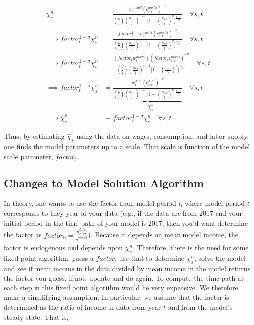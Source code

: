 \documentclass[letterpaper,12pt]{article}
\theoremstyle{definition}
\begin{document}
  \begin{equation}\label{EqChi_ns_model_algebra}
    \begin{split}
      \chi^n_s & = \frac{w^{model}_t\left(c^{model}_{s,t}\right)^{-\sigma}}{\left(\frac{b}{\tilde{l}}\right)\left(\frac{n_{s,t}}{\tilde{l}}\right)^{\upsilon-1}\Biggl[1 - \left(\frac{n_{s,t}}{\tilde{l}}\right)^\upsilon\Biggr]^{\frac{1-\upsilon}{\upsilon}}} \quad\forall s, t \\
      \implies factor^{1-\sigma}_{t} \chi^{n}_{s} & = \frac{factor^{1-\sigma}_{t}w^{model}_t\left(c^{model}_{s,t}\right)^{-\sigma}}{\left(\frac{b}{\tilde{l}}\right)\left(\frac{n_{s,t}}{\tilde{l}}\right)^{\upsilon-1}\Biggl[1 - \left(\frac{n_{s,t}}{\tilde{l}}\right)^\upsilon\Biggr]^{\frac{1-\upsilon}{\upsilon}}} \quad\forall s, t \\
      \implies factor^{1-\sigma}_{t} \chi^{n}_{s} & = \frac{\left(factor_{t}w^{model}_t\right)\left(factor_{t} c^{model}_{s,t}\right)^{-\sigma}}{\left(\frac{b}{\tilde{l}}\right)\left(\frac{n_{s,t}}{\tilde{l}}\right)^{\upsilon-1}\Biggl[1 - \left(\frac{n_{s,t}}{\tilde{l}}\right)^\upsilon\Biggr]^{\frac{1-\upsilon}{\upsilon}}} \quad\forall s, t \\
      \implies factor^{1-\sigma}_{t} \chi^{n}_{s} & = \underbrace{\frac{w^{data}_t\left( c^{data}_{s,t}\right)^{-\sigma}}{\left(\frac{b}{\tilde{l}}\right)\left(\frac{n_{s,t}}{\tilde{l}}\right)^{\upsilon-1}\Biggl[1 - \left(\frac{n_{s,t}}{\tilde{l}}\right)^\upsilon\Biggr]^{\frac{1-\upsilon}{\upsilon}}}}_{=\hat{\chi}^{n}_{s}} \quad\forall s, t \\
      \implies \hat{\chi}^n_s &\equiv factor^{1-\sigma}_{t} \chi^{n}_{s} \quad\forall s, t
    \end{split}
  \end{equation}

  Thus, by estimating $\hat{\chi}^{n}_{s}$ using the data on wages, consumption, and labor supply, one finds the model parameters up to a scale.  That scale is function of the model scale parameter, $factor_{t}$.

  \subsection{Changes to Model Solution Algorithm}
  In theory, one wants to use the factor from model period $t$, where model period $t$ corresponds to they year of your data (e.g., if the data are from 2017 and your initial period in the time path of your model is 2017, then you'd want determine the factor as $factor_{0}=\frac{\bar{y}^{data}_{2017}}{\bar{y}^{model}_{0}}$).  Because it depends on mean model income, the factor is endogenous and depends upon $\chi^{n}_{s}$.  Therefore, there is the need for some fixed point algorithm: guess a $factor$, use that to determine $\chi^{n}_{s}$, solve the model and see if mean income in the data divided by mean income in the model returns the factor you guess, if not, update and do again.  To compute the time path at each step in this fixed point algorithm would be very expensive.  We therefore make a simplifying assumption.  In particular, we assume that the factor is determined as the ratio of income in data from year $t$ and from the model's steady state.  That is,
\end{document}
